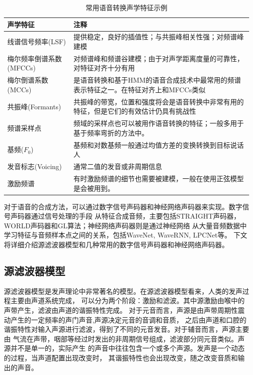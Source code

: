 \begin{table}[!hpt]
    \caption[常用语音转换声学特征示例]{常用语音转换声学特征示例}
    \label{tab:vc_feats}
    \centering
    \begin{tabular}{p{}p{}} 
        \toprule
        声学特征 & 注释　\\
        \midrule
        线谱信号频率(LSF) & 提供稳定，良好的插值性；与共振峰相关性强；对频谱峰建模　\\
        梅尔频率倒谱系数(MFCCs) & 对频谱峰和频谱谷建模；由于对声学距离度量的可靠性，对特征对齐十分有用 \\
        梅尔倒谱系数(MCCs) & 是语音转换和基于HMM的语音合成技术中最常用的频谱表示特征之一。在特征对齐上和MFCCs类似　\\
        共振峰(Formants) & 共振峰的带宽，位置和强度将会是语音转换中非常有用的特征，但是它们的有效估计仍具有挑战性　\\
        频谱采样点 & 频域的采样点也可以被用作语音转换的特征；一般多用于基于频率弯折的方法中。\\
        \midrule
        基频($F_0$) & 基频和对数基频一般通过均值方差的变换转换到目标说话人 \\
        \midrule
        发音标志(Voicing) & 通常二值的发音或非周期信息 \\
        \midrule
        激励频谱 & 有时激励频谱的细节也需要被建模，一般在使用正弦模型是会被用到。\\
        \bottomrule
    \end{tabular}
\end{table}

对于语音的合成方法，可以通过数字信号声码器和神经网络声码器来实现。数字信号声码器通过信号处理的手段
从特征合成音频，主要包括STRAIGHT声码器，WORLD声码器和GL算法；神经网络声码器则是通过神经网络
从大量音频数据中学习特征与音频样本点之间的关系，包括WaveNet, WaveRNN, LPCNet等。
下文将详细介绍源滤波器模型和几种常用的数字信号声码器和神经网络声码器。

\subsection{源滤波器模型}
源滤波器模型是发声理论中非常著名的模型。在源滤波器模型看来，人类的发声过程主要由声道系统完成，
可以分为两个阶段：激励和滤波。其中源激励由喉中的声带产生，滤波由声道的谐振特性完成。
对于元音而言，声源是由声带周期性震动产生的一定频率的声门声音,声源决定元音的音调和音质，
之后由声道和口腔的谐振特性对输入声源进行滤波，得到了不同的元音发音。对于辅音而言，声源主要由
气流在声带，咽部等经过时发出的非周期信号组成，滤波部分同元音类似。声源并不是单一的，实际产生
的声音中往往包含一个或多个声源。发声是一个动态的过程，当声道配置出现改变时，
其谐振特性也会出现改变，随之改变音质和输出的声音。

